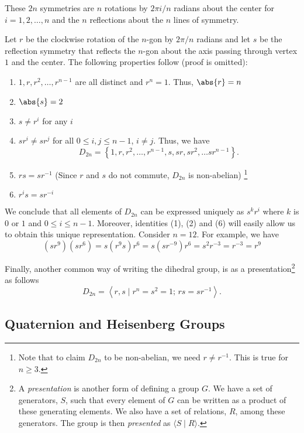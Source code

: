 These $2n$ symmetries are $n$ rotations by $2\pi i/n$ radians about the center for $i=1,2, \ldots, n$ and the $n$ reflections about the $n$ lines of symmetry.

\medskip

Let $r$ be the clockwise rotation of the $n$-gon by $2\pi/n$ radians and let $s$ be the reflection symmetry that reflects the $n$-gon about the axis passing through vertex $1$ and the center. The following properties follow (proof is omitted):
\begin{enumerate}
    \item $1,r,r^2, \ldots, r^{n-1}$ are all distinct and $r^n = 1$. Thus, $\abs{r} = n$
    \item $\abs{s} = 2$
    \item $s \neq r^i$ for any $i$
    \item $sr^i \neq sr^j$ for all $0 \leq i,j \leq n-1$, $i \neq j$. Thus, we have
    \[
        D_{2n} = \left\{ 1, r, r^2,\ldots, r^{n-1}, s, sr, sr^2, \ldots sr^{n-1} \right\}.
    \]
    \item $rs = sr^{-1}$ (Since $r$ and $s$ do not commute, $D_{2n}$ is non-abelian) \footnote{Note that to claim $D_{2n}$ to be non-abelian, we need $r \neq r^{-1}$. This is true for $n \geq 3$.}
    \item $r^is = sr^{-i}$
\end{enumerate}

We conclude that all elements of $D_{2n}$ can be expressed uniquely as $s^kr^i$ where $k$ is $0$ or $1$ and $0 \leq i \leq n-1$. Moreover, identities (1), (2) and (6) will easily allow us to obtain this unique representation. Consider $n=12$. For example, we have
\[
    (sr^9)(sr^6) = s(r^9s)r^6 = s(sr^{-9})r^6 = s^2r^{-3} = r^{-3} = r^9
\]

Finally, another common way of writing the dihedral group, is as a presentation\footnote{A \emph{presentation} is another form of defining a group $G$. We have a set of generators, $S$, such that every element of $G$ can be written as a product of these generating elements. We also have a set of relations, $R$, among these generators. The group is then \emph{presented} as $\langle S \mid R \rangle$.} as follows
\[
    D_{2n} = \left\langle r,s \mid r^n = s^2 = 1 ; \, rs = sr^{-1} \right\rangle.
\]

\subsection{Quaternion and Heisenberg Groups}

